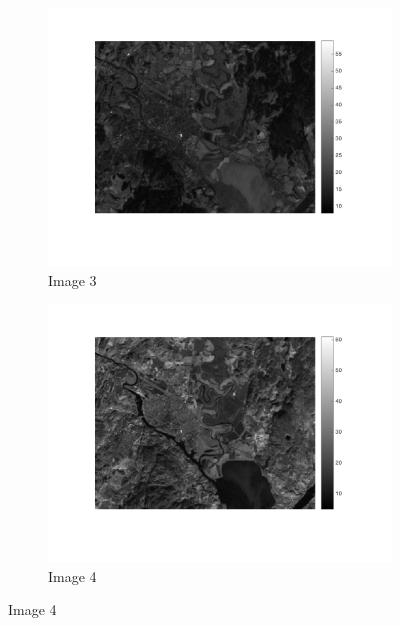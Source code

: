 \documentclass[12pt,a4paper]{report}
\begin{document}
\begin{figure}[!ht]
	\begin{subfigure}{0.5\textwidth}
	\centering
	\includegraphics[width=1.0\textwidth]{Landsat3}	
	\caption*{Image 3}
	\end{subfigure} 
	\begin{subfigure}{0.5\textwidth}
	\centering
	\includegraphics[width=1.0\textwidth]{Landsat4}	
	\caption*{Image 4}
	\end{subfigure}
\end{figure}
\end{document}
